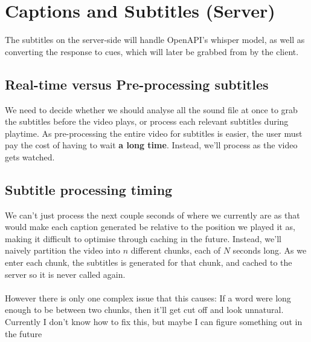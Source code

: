\documentclass{article}
\begin{document}
\section*{Captions and Subtitles (Server)}
The subtitles on the server-side will handle OpenAPI's whisper model, as well as converting the response to cues, which will later be grabbed from by the client.

\subsection*{Real-time versus Pre-processing subtitles}
We need to decide whether we should analyse all the sound file at once to grab the subtitles before the video plays, or process each relevant subtitles during playtime. As pre-processing the entire video for subtitles is easier, the user must pay the cost of having to wait \textbf{a long time}. Instead, we'll process as the video gets watched.

\subsection*{Subtitle processing timing}
We can't just process the next couple seconds of where we currently are as that would make each caption generated be relative to the position we played it as, making it difficult to optimise through caching in the future. Instead, we'll naively partition the video into $n$ different chunks, each of $N$ seconds long. As we enter each chunk, the subtitles is generated for that chunk, and cached to the server so it is never called again. 
\\\\
However there is only one complex issue that this causes: If a word were long enough to be between two chunks, then it'll get cut off and look unnatural. Currently I don't know how to fix this, but maybe I can figure something out in the future

\subsection*{}
\end{document}
